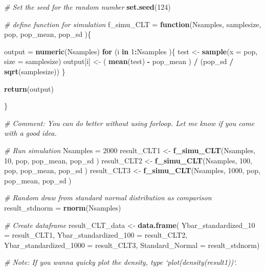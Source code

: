 \documentclass[]{book}
\newenvironment{Shaded}{\begin{snugshade}}{\end{snugshade}}
\newcommand{\KeywordTok}[1]{\textcolor[rgb]{0.13,0.29,0.53}{\textbf{#1}}}
\newcommand{\DataTypeTok}[1]{\textcolor[rgb]{0.13,0.29,0.53}{#1}}
\newcommand{\DecValTok}[1]{\textcolor[rgb]{0.00,0.00,0.81}{#1}}
\newcommand{\StringTok}[1]{\textcolor[rgb]{0.31,0.60,0.02}{#1}}
\newcommand{\CommentTok}[1]{\textcolor[rgb]{0.56,0.35,0.01}{\textit{#1}}}
\newcommand{\ControlFlowTok}[1]{\textcolor[rgb]{0.13,0.29,0.53}{\textbf{#1}}}
\newcommand{\OperatorTok}[1]{\textcolor[rgb]{0.81,0.36,0.00}{\textbf{#1}}}
\newcommand{\NormalTok}[1]{#1}
\begin{document}
\begin{Shaded}
\begin{Highlighting}[]
\CommentTok{# Set the seed for the random number}
\KeywordTok{set.seed}\NormalTok{(}\DecValTok{124}\NormalTok{)}

\CommentTok{# define function for simulation }
\NormalTok{f_simu_CLT =}\StringTok{ }\ControlFlowTok{function}\NormalTok{(Nsamples, samplesize, pop, pop_mean, pop_sd )\{}
  
\NormalTok{  output =}\StringTok{ }\KeywordTok{numeric}\NormalTok{(Nsamples)}
  \ControlFlowTok{for}\NormalTok{ (i }\ControlFlowTok{in} \DecValTok{1}\OperatorTok{:}\NormalTok{Nsamples )\{}
\NormalTok{    test <-}\StringTok{ }\KeywordTok{sample}\NormalTok{(}\DataTypeTok{x =}\NormalTok{ pop, }\DataTypeTok{size =}\NormalTok{ samplesize)}
\NormalTok{    output[i] <-}\StringTok{ }\NormalTok{( }\KeywordTok{mean}\NormalTok{(test) }\OperatorTok{-}\StringTok{ }\NormalTok{pop_mean ) }\OperatorTok{/}\StringTok{ }\NormalTok{(pop_sd }\OperatorTok{/}\StringTok{ }\KeywordTok{sqrt}\NormalTok{(samplesize))}
\NormalTok{  \}}
  
  \KeywordTok{return}\NormalTok{(output)}

\NormalTok{\}}

\CommentTok{# Comment: You can do better without using forloop. Let me know if you come with a good idea.}

\CommentTok{# Run simulation }
\NormalTok{Nsamples =}\StringTok{ }\DecValTok{2000}
\NormalTok{result_CLT1 <-}\StringTok{ }\KeywordTok{f_simu_CLT}\NormalTok{(Nsamples, }\DecValTok{10}\NormalTok{, pop, pop_mean, pop_sd )}
\NormalTok{result_CLT2 <-}\StringTok{ }\KeywordTok{f_simu_CLT}\NormalTok{(Nsamples, }\DecValTok{100}\NormalTok{, pop, pop_mean, pop_sd )}
\NormalTok{result_CLT3 <-}\StringTok{ }\KeywordTok{f_simu_CLT}\NormalTok{(Nsamples, }\DecValTok{1000}\NormalTok{, pop, pop_mean, pop_sd )}

\CommentTok{# Random draw from standard normal distribution as comparison}
\NormalTok{result_stdnorm =}\StringTok{ }\KeywordTok{rnorm}\NormalTok{(Nsamples)}

\CommentTok{# Create dataframe}
\NormalTok{result_CLT_data <-}\StringTok{ }\KeywordTok{data.frame}\NormalTok{(  }\DataTypeTok{Ybar_standardized_10 =}\NormalTok{ result_CLT1, }
                            \DataTypeTok{Ybar_standardized_100 =}\NormalTok{ result_CLT2, }
                            \DataTypeTok{Ybar_standardized_1000 =}\NormalTok{ result_CLT3, }
                            \DataTypeTok{Standard_Normal =}\NormalTok{ result_stdnorm)}

\CommentTok{# Note: If you wanna quicky plot the density, type `plot(density(result1))`. }
\end{Highlighting}
\end{Shaded}
\end{document}
